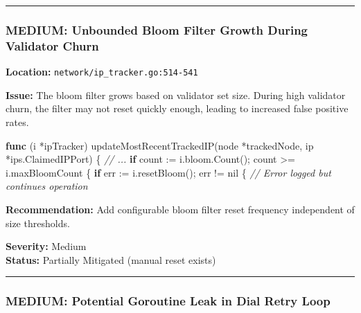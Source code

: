 \documentclass[
]{article}
\newenvironment{Shaded}{}{}
\newcommand{\CommentTok}[1]{\textcolor[rgb]{0.38,0.63,0.69}{\textit{#1}}}
\newcommand{\ControlFlowTok}[1]{\textcolor[rgb]{0.00,0.44,0.13}{\textbf{#1}}}
\newcommand{\KeywordTok}[1]{\textcolor[rgb]{0.00,0.44,0.13}{\textbf{#1}}}
\newcommand{\NormalTok}[1]{#1}
\newcommand{\OperatorTok}[1]{\textcolor[rgb]{0.40,0.40,0.40}{#1}}
\newcommand{\OtherTok}[1]{\textcolor[rgb]{0.00,0.44,0.13}{#1}}
\begin{document}
\begin{center}\rule{0.5\linewidth}{0.5pt}\end{center}

\subsubsection{MEDIUM: Unbounded Bloom Filter Growth During Validator
Churn}\label{medium-unbounded-bloom-filter-growth-during-validator-churn}

\textbf{Location:} \texttt{network/ip\_tracker.go:514-541}

\textbf{Issue:} The bloom filter grows based on validator set size.
During high validator churn, the filter may not reset quickly enough,
leading to increased false positive rates.

\begin{Shaded}
\begin{Highlighting}[]
\KeywordTok{func} \OperatorTok{(}\NormalTok{i }\OperatorTok{*}\NormalTok{ipTracker}\OperatorTok{)}\NormalTok{ updateMostRecentTrackedIP}\OperatorTok{(}\NormalTok{node }\OperatorTok{*}\NormalTok{trackedNode}\OperatorTok{,}\NormalTok{ ip }\OperatorTok{*}\NormalTok{ips}\OperatorTok{.}\NormalTok{ClaimedIPPort}\OperatorTok{)} \OperatorTok{\{}
    \CommentTok{// ...}
    \ControlFlowTok{if}\NormalTok{ count }\OperatorTok{:=}\NormalTok{ i}\OperatorTok{.}\NormalTok{bloom}\OperatorTok{.}\NormalTok{Count}\OperatorTok{();}\NormalTok{ count }\OperatorTok{\textgreater{}=}\NormalTok{ i}\OperatorTok{.}\NormalTok{maxBloomCount }\OperatorTok{\{}
        \ControlFlowTok{if}\NormalTok{ err }\OperatorTok{:=}\NormalTok{ i}\OperatorTok{.}\NormalTok{resetBloom}\OperatorTok{();}\NormalTok{ err }\OperatorTok{!=} \OtherTok{nil} \OperatorTok{\{}
            \CommentTok{// Error logged but continues operation}
\end{Highlighting}
\end{Shaded}

\textbf{Recommendation:} Add configurable bloom filter reset frequency
independent of size thresholds.

\textbf{Severity:} Medium\\
\textbf{Status:} Partially Mitigated (manual reset exists)

\begin{center}\rule{0.5\linewidth}{0.5pt}\end{center}

\subsubsection{MEDIUM: Potential Goroutine Leak in Dial Retry
Loop}\label{medium-potential-goroutine-leak-in-dial-retry-loop}
\end{document}
